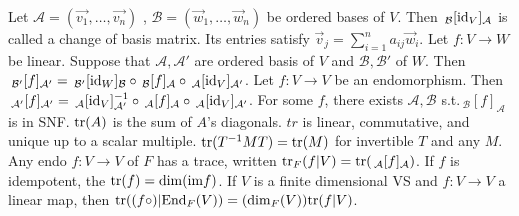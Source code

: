  Let $\mathcal{A} = (\vec{v_1}, \dots, \vec{v_n})$ , $\mathcal{B} = (\vec{w}_1, \dots, \vec{w}_n)$ be ordered bases of $V$. Then $\,_\mathcal{B}[\text{id}_V]_\mathcal{A}$ is called a change of basis matrix. Its entries satisfy $\vec{v}_j = \sum_{i=1}^n a_{ij}\vec{w}_i$.
 Let $f : V \to W$ be linear. Suppose that $\mathcal{A}, \mathcal{A}'$ are ordered basis of $V$ and $\mathcal{B}, \mathcal{B}'$ of $W$. Then $\,_{\mathcal{B}'}[f]_{\mathcal{A}'} = \,_{\mathcal{B}'}[\text{id}_W]_{\mathcal{B}} \circ \,_{\mathcal{B}}[f]_{\mathcal{A}} \circ \,_{\mathcal{A}}[\text{id}_V]_{\mathcal{A}'}$.
 Let $f : V \to V$ be an endomorphism. Then $\,_{\mathcal{A}'}[f]_{\mathcal{A}'} = \,_{\mathcal{A}}[\text{id}_V]_{\mathcal{A}'}^{-1} \circ \,_{\mathcal{A}}[f]_{\mathcal{A}} \circ \,_{\mathcal{A}}[\text{id}_V]_{\mathcal{A}'}$.
 For some $f$, there exists $\mathcal{A}, \mathcal{B}$ s.t.\@ $\,_{\mathcal{B}}[f]_{\mathcal{A}}$ is in SNF.
 $\text{tr}(A)$ is the sum of $A$'s diagonals.
$tr$ is linear, commutative, and unique up to a scalar multiple. $\text{tr}(T^{-1}MT) = \text{tr}(M)$ for invertible $T$ and any $M$.
Any endo $f : V \to V$ of $F$ has a trace, written $\text{tr}_F(f|V) = \text{tr}(\,_{\mathcal{A}}[f]_{\mathcal{A}})$. If $f$ is idempotent, the $\text{tr}(f) = \dim(\text{im} f)$.
If $V$ is a finite dimensional VS and $f : V \to V$ a linear map, then $\text{tr}((f \circ) | \text{End}_F(V)) = (\dim_F (V)) \text{tr}(f | V)$.
